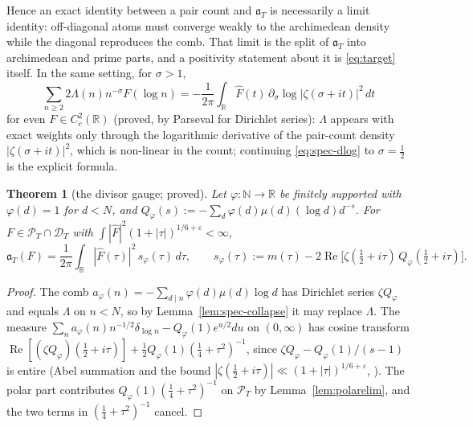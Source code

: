 \documentclass[11pt]{amsart}
\newtheorem{theorem}{Theorem}[section]
\theoremstyle{definition}
\theoremstyle{remark}
\newcommand{\R}{\mathbb R}
\newcommand{\N}{\mathbb N}
\newcommand{\Rel}{\operatorname{Re}}
\newcommand{\PT}{\mathcal P_T}
\newcommand{\Fh}{\widehat F}
\begin{document}
Hence an exact identity between a pair count and $\mathfrak a_T$ is necessarily a limit identity: off-diagonal atoms must converge
weakly to the archimedean density while the diagonal reproduces the comb. That limit is the split of $\mathfrak a_T$ into archimedean
and prime parts, and a positivity statement about it is \eqref{eq:target} itself. In the same setting, for $\sigma>1$,
\begin{equation}\label{eq:spec-dlog}
\sum_{n\ge2}2\Lambda(n)n^{-\sigma}F(\log n)=-\frac1{2\pi}\int_\R\Fh(t)\,\partial_\sigma\log|\zeta(\sigma+it)|^2\,dt
\end{equation}
for even $F\in C^2_c(\R)$ (proved, by Parseval for Dirichlet series): $\Lambda$ appears with exact weights only through the logarithmic
derivative of the pair-count density $|\zeta(\sigma+it)|^2$, which is non-linear in the count; continuing \eqref{eq:spec-dlog} to
$\sigma=\frac12$ is the explicit formula.

\begin{theorem}[the divisor gauge; proved]\label{thm:spec-gauge}
Let $\varphi:\N\to\R$ be finitely supported with $\varphi(d)=1$ for $d<N$, and $Q_\varphi(s):=-\sum_d\varphi(d)\mu(d)(\log d)d^{-s}$. For
$F\in\PT\cap\mathcal D_T$ with $\int|\Fh|^2(1+|\tau|)^{1/6+\varepsilon}<\infty$,
\[
\mathfrak a_T(F)=\frac1{2\pi}\int_\R|\Fh(\tau)|^2\,s_\varphi(\tau)\,d\tau,\qquad
s_\varphi(\tau):=m(\tau)-2\Rel\big[\zeta(\tfrac12+i\tau)\,Q_\varphi(\tfrac12+i\tau)\big].
\]
\end{theorem}
\begin{proof}
The comb $a_\varphi(n)=-\sum_{d\mid n}\varphi(d)\mu(d)\log d$ has Dirichlet series $\zeta Q_\varphi$ and equals $\Lambda$ on $n<N$, so by
Lemma~\ref{lem:spec-collapse} it may replace $\Lambda$. The measure $\sum_na_\varphi(n)n^{-1/2}\delta_{\log n}-Q_\varphi(1)e^{u/2}du$ on
$(0,\infty)$ has cosine transform $\Rel[(\zeta Q_\varphi)(\frac12+i\tau)]+\frac12Q_\varphi(1)(\frac14+\tau^2)^{-1}$, since
$\zeta Q_\varphi-Q_\varphi(1)/(s-1)$ is entire (Abel summation and the bound $|\zeta(\frac12+i\tau)|\ll(1+|\tau|)^{1/6+\varepsilon}$,
\cite[Ch.~V]{Titchmarsh1986}). The polar part contributes $Q_\varphi(1)(\frac14+\tau^2)^{-1}$ on $\PT$ by Lemma~\ref{lem:polarelim}, and
the two terms in $(\frac14+\tau^2)^{-1}$ cancel.
\end{proof}
\end{document}
